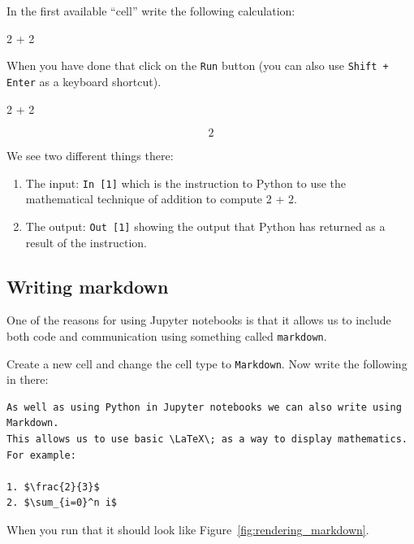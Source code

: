 In the first available “cell” write the following calculation:

\begin{pyin}
    2 + 2
\end{pyin}


When you have done that click on the \texttt{Run} button (you can also use
\texttt{Shift + Enter} as a keyboard shortcut).

\begin{pyin}
    2 + 2
\end{pyin}

\[2\]

We see two different things there:

\begin{enumerate}
\item 

The input: \texttt{In {[}1{]}} which is the instruction to Python to use the
mathematical technique of addition to compute 2 + 2.

\item 

The output: \texttt{Out {[}1{]}} showing the output that Python has returned as a result
of the instruction.

\end{enumerate}


\subsection{Writing markdown}

One of the reasons for using Jupyter notebooks is that it allows us to include
both code and communication using something called \texttt{markdown}.


Create a new cell and change the cell type to \texttt{Markdown}. Now write the
following in there:

\begin{verbatim}
As well as using Python in Jupyter notebooks we can also write using Markdown.
This allows us to use basic \LaTeX\; as a way to display mathematics.
For example:

1. $\frac{2}{3}$
2. $\sum_{i=0}^n i$
\end{verbatim}


When you run that it should look like Figure~\ref{fig:rendering_markdown}.

